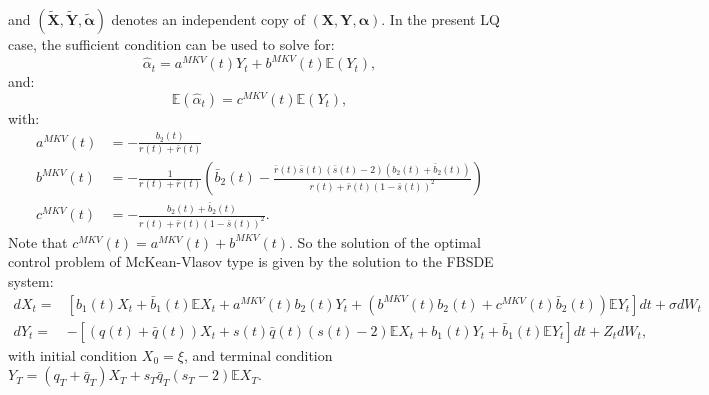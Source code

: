 \documentclass[11pt]{article}
\begin{document}
and $(\boldsymbol{\tilde{X}},\boldsymbol{\tilde{Y}},\boldsymbol{\tilde{\alpha}})$ denotes an independent copy of $(\boldsymbol{X},\boldsymbol{Y},\boldsymbol{\alpha})$. In the present LQ case, the sufficient condition can be used to solve for:
\begin{equation*}
    \hat{\alpha}_t=a^{MKV}(t)Y_t+b^{MKV}(t)\mathbb{E}(Y_t),
\end{equation*}
and:
\begin{equation*}
    \mathbb{E}(\hat{\alpha}_t)=c^{MKV}(t)\mathbb{E}(Y_t),
\end{equation*}
with:
\begin{equation*}
\begin{split}
    a^{MKV}(t)&=-\frac{b_2(t)}{r(t)+\bar{r}(t)} \\
    b^{MKV}(t)&=-\frac{1}{r(t)+\bar{r}(t)}\left(\bar{b}_2(t)-\frac{\bar{r}(t)\bar{s}(t)(\bar{s}(t)-2)(b_2(t)+\bar{b}_2(t))}{r(t)+\bar{r}(t)(1-\bar{s}(t))^2} \right) \\
    c^{MKV}(t)&=-\frac{b_2(t)+\bar{b}_2(t)}{r(t)+\bar{r}(t)(1-\bar{s}(t))^2}.
\end{split}
\end{equation*}
Note that $c^{MKV}(t)=a^{MKV}(t)+b^{MKV}(t)$. So the solution of the optimal control problem of McKean-Vlasov type is given by the solution to the FBSDE system:
\begin{equation}
\begin{split}
        dX_t=&\left[b_1(t)X_t+\bar{b}_1(t) \mathbb{E}X_t+a^{MKV}(t)b_2(t)Y_t+(b^{MKV}(t)b_2(t)+c^{MKV}(t)\bar{b}_2(t))\mathbb{E}Y_t\right]dt+\sigma dW_t \\
        dY_t=&-\left[(q(t)+\bar{q}(t))X_t+s(t)\bar{q}(t)(s(t)-2)\mathbb{E}X_t+b_1(t)Y_t+\bar{b}_1(t)\mathbb{E}Y_t\right]dt +Z_t dW_t,
\end{split}
\label{eq:FBSDE_EMKV}
\end{equation}
with initial condition $X_0=\xi$, and terminal condition $Y_T=(q_T+\bar{q}_T)X_T+s_T\bar{q}_T(s_T-2)\mathbb{E}X_T$.
\end{document}
